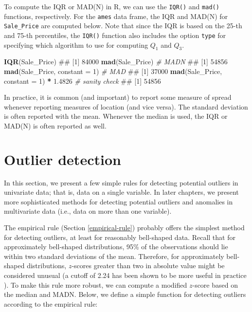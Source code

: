 \documentclass[]{book}
\newenvironment{Shaded}{\begin{snugshade}}{\end{snugshade}}
\newcommand{\CommentTok}[1]{\textcolor[rgb]{0.56,0.35,0.01}{\textit{#1}}}
\newcommand{\DataTypeTok}[1]{\textcolor[rgb]{0.13,0.29,0.53}{#1}}
\newcommand{\DecValTok}[1]{\textcolor[rgb]{0.00,0.00,0.81}{#1}}
\newcommand{\FloatTok}[1]{\textcolor[rgb]{0.00,0.00,0.81}{#1}}
\newcommand{\KeywordTok}[1]{\textcolor[rgb]{0.13,0.29,0.53}{\textbf{#1}}}
\newcommand{\NormalTok}[1]{#1}
\newcommand{\OperatorTok}[1]{\textcolor[rgb]{0.81,0.36,0.00}{\textbf{#1}}}
\newcommand{\StringTok}[1]{\textcolor[rgb]{0.31,0.60,0.02}{#1}}
\theoremstyle{definition}
\theoremstyle{definition}
\theoremstyle{definition}
\theoremstyle{remark}
\begin{document}
To compute the IQR or MAD(N) in R, we can use the \texttt{IQR()} and
\texttt{mad()} functions, respectively. For the \texttt{ames} data
frame, the IQR and MAD(N) for \texttt{Sale\_Price} are computed below.
Note that since the IQR is based on the 25-th and 75-th percentiles, the
\texttt{IQR()} function also includes the option \texttt{type} for
specifying which algorithm to use for computing \(Q_1\) and \(Q_3\).

\begin{Shaded}
\begin{Highlighting}[]
\KeywordTok{IQR}\NormalTok{(Sale_Price)}
\NormalTok{## [1] 84000}
\KeywordTok{mad}\NormalTok{(Sale_Price)  }\CommentTok{# MADN}
\NormalTok{## [1] 54856}
\KeywordTok{mad}\NormalTok{(Sale_Price, }\DataTypeTok{constant =} \DecValTok{1}\NormalTok{)  }\CommentTok{# MAD}
\NormalTok{## [1] 37000}
\KeywordTok{mad}\NormalTok{(Sale_Price, }\DataTypeTok{constant =} \DecValTok{1}\NormalTok{) }\OperatorTok{*}\StringTok{ }\FloatTok{1.4826}  \CommentTok{# sanity check}
\NormalTok{## [1] 54856}
\end{Highlighting}
\end{Shaded}

In practice, it is common (and important) to report some measure of
spread whenever reporting measures of location (and vice versa). The
standard deviation is often reported with the mean. Whenever the median
is used, the IQR or MAD(N) is often reported as well.

\hypertarget{outliers}{%
\section{Outlier detection}\label{outliers}}

In this section, we present a few simple rules for detecting potential
outliers in univariate data; that is, data on a single variable. In
later chapters, we present more sophisticated methods for detecting
potential outliers and anomalies in multivariate data (i.e., data on
more than one variable).

The empirical rule (Section \ref{empirical-rule}) probably offers the
simplest method for detecting outliers, at least for reasonably
bell-shaped data. Recall that for approximately bell-shaped
distributions, 95\% of the observations should lie within two standard
deviations of the mean. Therefore, for approximately bell-shaped
distributions, \(z\)-scores greater than two in absolute value might be
considered unusual (a cutoff of 2.24 has been shown to be more useful in
practice \citep{wilcox-applying-2003}). To make this rule more robust,
we can compute a modified \(z\)-score based on the median and MADN.
Below, we define a simple function for detecting outliers according to
the empirical rule:
\end{document}
